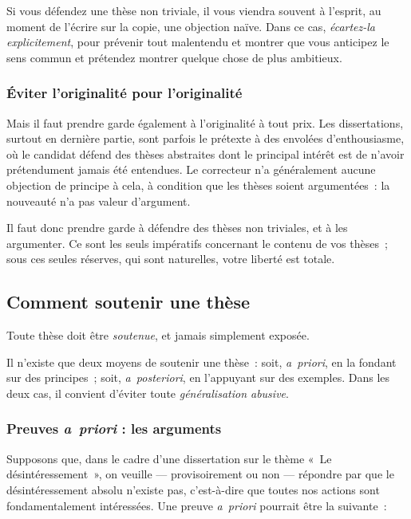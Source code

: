 \documentclass[a4paper]{article}
\begin{document}
Si vous défendez une thèse non triviale, il vous viendra souvent à
l'esprit, au moment de l'écrire sur la copie, une objection naïve. Dans
ce cas, \emph{écartez-la explicitement}, pour prévenir tout malentendu et
montrer que vous anticipez le sens commun et prétendez montrer quelque
chose de plus ambitieux.

\subsubsection{Éviter l'originalité pour l'originalité}
\label{sec-3-2-4}

Mais il faut prendre garde également à l'originalité à tout prix. Les
dissertations, surtout en dernière partie, sont parfois le prétexte à
des envolées d'enthousiasme, où le candidat défend des thèses abstraites
dont le principal intérêt est de n'avoir prétendument jamais été
entendues. Le correcteur n'a généralement aucune objection de principe à
cela, à condition que les thèses soient argumentées : la nouveauté n'a
pas valeur d'argument.

Il faut donc prendre garde à défendre des thèses non triviales, et à les
argumenter. Ce sont les seuls impératifs concernant le contenu de vos
thèses ; sous ces seules réserves, qui sont naturelles, votre liberté
est totale.

\subsection{Comment soutenir une thèse}
\label{sec-3-3}

Toute thèse doit être \emph{soutenue}, et jamais simplement exposée.

Il n'existe que deux moyens de soutenir une thèse : soit, \emph{a priori}, en
la fondant sur des principes ; soit, \emph{a posteriori}, en l'appuyant sur
des exemples. Dans les deux cas, il convient d'éviter toute
\emph{généralisation abusive}.

\subsubsection{Preuves \emph{a priori} : les arguments}
\label{sec-3-3-1}

Supposons que, dans le cadre d'une dissertation sur le thème « Le
désintéressement », on veuille --- provisoirement ou non --- répondre par
que le désintéressement absolu n'existe pas, c'est-à-dire que toutes nos
actions sont fondamentalement intéressées. Une preuve \emph{a priori}
pourrait être la suivante :
\end{document}
